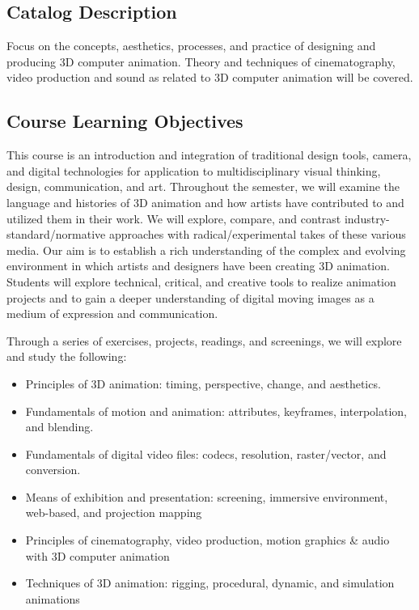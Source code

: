 \subsection{Catalog Description}

Focus on the concepts, aesthetics, processes, and practice of designing and producing 3D computer animation. Theory and techniques of cinematography, video production and sound as related to 3D computer animation will be covered.

\subsection{Course Learning Objectives}

This course is an introduction and integration of traditional design tools, camera, and digital technologies for application to multidisciplinary visual thinking, design, communication, and art. Throughout the semester, we will examine the language and histories of 3D animation and how artists have contributed to and utilized them in their work. We will explore, compare, and contrast industry-standard/normative approaches with radical/experimental takes of these various media. Our aim is to establish a rich understanding of the complex and evolving environment in which artists and designers have been creating 3D animation. Students will explore technical, critical, and creative tools to realize animation projects and to gain a deeper understanding of digital moving images as a medium of expression and communication.

Through a series of exercises, projects, readings, and screenings, we will explore and study the following:
\begin{itemize}
      \tightlist
      \item Principles of 3D animation: timing, perspective, change, and aesthetics.
      \item Fundamentals of motion and animation: attributes, keyframes, interpolation, and blending.
      \item Fundamentals of digital video files: codecs, resolution, raster/vector, and conversion.
      \item Means of exhibition and presentation: screening, immersive environment, web-based, and projection mapping
      \item Principles of cinematography, video production, motion graphics \& audio with 3D computer animation
      \item Techniques of 3D animation: rigging, procedural, dynamic, and simulation animations
\end{itemize}

